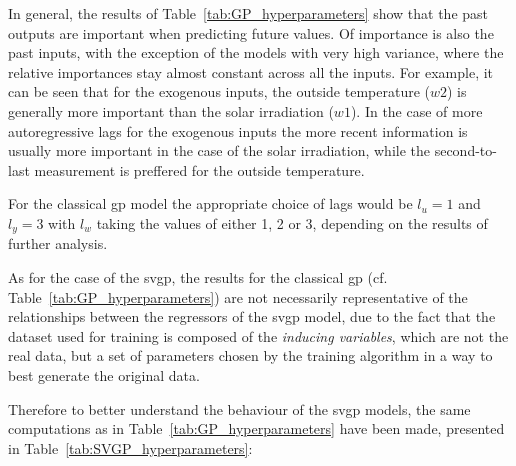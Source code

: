 In general, the results of Table~\ref{tab:GP_hyperparameters} show that the past
outputs are important when predicting future values. Of importance is also the
past inputs, with the exception of the models with very high variance, where the
relative importances stay almost constant across all the inputs. For example, it
can be seen that for the exogenous inputs, the outside temperature ($w2$) is
generally more important than the solar irradiation ($w1$). In the case of more
autoregressive lags for the exogenous inputs the more recent information is
usually more important in the case of the solar irradiation, while the
second-to-last measurement is preffered for the outside temperature.

For the classical \acrshort{gp} model the appropriate choice of lags would be
$l_u = 1$ and $l_y = 3$ with $l_w$ taking the values of either 1, 2 or 3,
depending on the results of further analysis.


As for the case of the \acrshort{svgp}, the results for the classical
\acrshort{gp} (cf. Table~\ref{tab:GP_hyperparameters}) are not necessarily
representative of the relationships between the regressors of the
\acrshort{svgp} model, due to the fact that the dataset used for training is
composed of the \textit{inducing variables}, which are not the real data, but a
set of parameters chosen by the training algorithm in a way to best generate the
original data.

Therefore to better understand the behaviour of the \acrshort{svgp} models, the
same computations as in Table~\ref{tab:GP_hyperparameters} have been made,
presented in Table~\ref{tab:SVGP_hyperparameters}:

